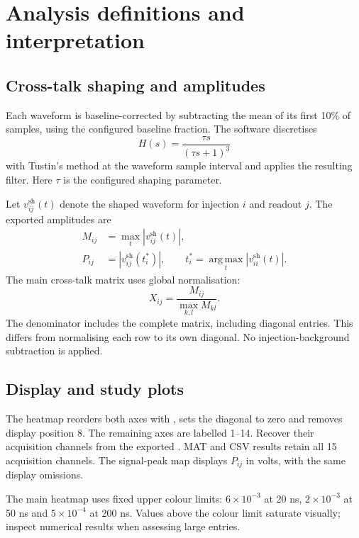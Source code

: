 \section{Analysis definitions and interpretation}
\label{sec:analysis}
\subsection{Cross-talk shaping and amplitudes}
Each waveform is baseline-corrected by subtracting the mean of its first 10\% of samples, using the configured baseline fraction. The software discretises
\begin{equation}
 H(s)=\frac{\tau s}{(\tau s+1)^3}
\end{equation}
with Tustin's method at the waveform sample interval and applies the resulting filter. Here $\tau$ is the configured shaping parameter.

Let $v_{ij}^{\mathrm{sh}}(t)$ denote the shaped waveform for injection $i$ and readout $j$. The exported amplitudes are
\begin{align}
 M_{ij}&=\max_t\left|v_{ij}^{\mathrm{sh}}(t)\right|,\\
 P_{ij}&=\left|v_{ij}^{\mathrm{sh}}(t_i^*)\right|,\qquad
 t_i^*=\operatorname*{arg\,max}_t\left|v_{ii}^{\mathrm{sh}}(t)\right|.
\end{align}
The main cross-talk matrix uses global normalisation:
\begin{equation}
 X_{ij}=\frac{M_{ij}}{\displaystyle\max_{k,l}M_{kl}}.
\end{equation}
The denominator includes the complete matrix, including diagonal entries. This differs from normalising each row to its own diagonal. No injection-background subtraction is applied.

\subsection{Display and study plots}
The heatmap reorders both axes with , sets the diagonal to zero and removes display position 8. The remaining axes are labelled 1--14. Recover their acquisition channels from the exported . MAT and CSV results retain all 15 acquisition channels. The signal-peak map displays $P_{ij}$ in volts, with the same display omissions.

The main heatmap uses fixed upper colour limits: $6\times10^{-3}$ at 20 ns, $2\times10^{-3}$ at 50 ns and $5\times10^{-4}$ at 200 ns. Values above the colour limit saturate visually; inspect numerical results when assessing large entries.

